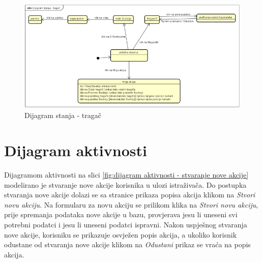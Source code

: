 		\begin{figure}[H]
			\includegraphics[scale=1]{slike/dijagram stanja - tragač.png}
			\centering
			\caption{Dijagram stanja - tragač}
			\label{fig:dijagram stanja - tragač}
		\end{figure}
			
			\eject 
		
		\section{Dijagram aktivnosti}

		Dijagramom aktivnosti na slici  \ref{fig:dijagram aktivnosti - stvaranje nove akcije} modelirano je stvaranje nove akcije korisnika u ulozi istraživača.
		Do postupka stvaranja nove akcije dolazi se sa stranice prikaza popisa akcija klikom na 
		\textit{Stvori novu akciju}. Na formularu za novu akciju se prilikom klika na \textit{Stvori novu akciju},
		prije spremanja podataka nove akcije u bazu, provjerava jesu li uneseni svi potrebni podatci i jesu li uneseni podatci ispravni.
		Nakon uspješnog stvaranja nove akcije, korisniku se prikazuje osvježen popis akcija, a ukoliko korisnik odustane od stvaranja nove akcije klikom na 
		\textit{Odustani} prikaz se vraća na popis akcija.

